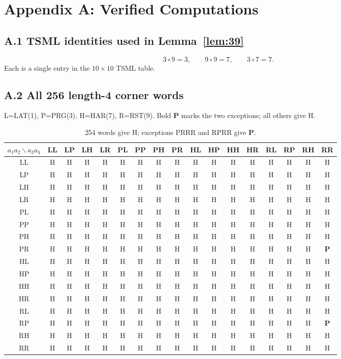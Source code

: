 \documentclass[11pt]{article}
\begin{document}
\section*{Appendix A: Verified Computations}

\subsection*{A.1 TSML identities used in Lemma~\ref{lem:39}}
\[
  3\circ9=3,\qquad 9\circ9=7,\qquad 3\circ7=7.
\]
Each is a single entry in the $10\times10$ TSML table.

\subsection*{A.2 All 256 length-4 corner words}

L=LAT(1), P=PRG(3), H=HAR(7), R=RST(9).
Bold \textbf{P} marks the two exceptions; all others give H.

\begin{table}[h]
\centering\small
\begin{tabular}{c|cccccccccccccccc}
\hline
$a_1a_2\backslash a_3a_4$ & LL & LP & LH & LR & PL & PP & PH & PR & HL & HP & HH & HR & RL & RP & RH & RR \\
\hline
LL & H & H & H & H & H & H & H & H & H & H & H & H & H & H & H & H \\
LP & H & H & H & H & H & H & H & H & H & H & H & H & H & H & H & H \\
LH & H & H & H & H & H & H & H & H & H & H & H & H & H & H & H & H \\
LR & H & H & H & H & H & H & H & H & H & H & H & H & H & H & H & H \\
PL & H & H & H & H & H & H & H & H & H & H & H & H & H & H & H & H \\
PP & H & H & H & H & H & H & H & H & H & H & H & H & H & H & H & H \\
PH & H & H & H & H & H & H & H & H & H & H & H & H & H & H & H & H \\
PR & H & H & H & H & H & H & H & H & H & H & H & H & H & H & H & \textbf{P} \\
HL & H & H & H & H & H & H & H & H & H & H & H & H & H & H & H & H \\
HP & H & H & H & H & H & H & H & H & H & H & H & H & H & H & H & H \\
HH & H & H & H & H & H & H & H & H & H & H & H & H & H & H & H & H \\
HR & H & H & H & H & H & H & H & H & H & H & H & H & H & H & H & H \\
RL & H & H & H & H & H & H & H & H & H & H & H & H & H & H & H & H \\
RP & H & H & H & H & H & H & H & H & H & H & H & H & H & H & H & \textbf{P} \\
RH & H & H & H & H & H & H & H & H & H & H & H & H & H & H & H & H \\
RR & H & H & H & H & H & H & H & H & H & H & H & H & H & H & H & H \\
\hline
\end{tabular}
\caption{254 words give H; exceptions PRRR and RPRR give \textbf{P}.}
\end{table}
\end{document}
